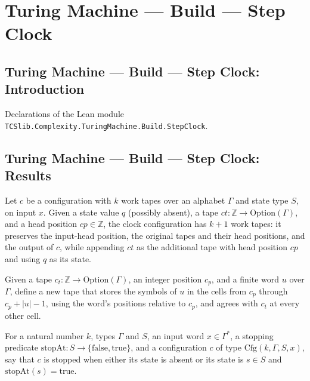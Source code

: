 \section{Turing Machine --- Build --- Step Clock}
\subsection*{Turing Machine --- Build --- Step Clock: Introduction}

Declarations of the Lean module \texttt{TCSlib.Complexity.TuringMachine.Build.StepClock}.

\subsection*{Turing Machine --- Build --- Step Clock: Results}

\begin{definition}
\label{Turing.clockCfg}
\leanok
{}
Let $c$ be a configuration with $k$ work tapes over an alphabet $\Gamma$ and state type
$S$, on input $x$. Given a state value $q$ (possibly absent), a tape
$ct:\mathbb{Z}\to\mathrm{Option}(\Gamma)$, and a head position $cp\in\mathbb{Z}$, the
clock configuration has $k+1$ work tapes: it preserves the input-head position, the
original tapes and their head positions, and the output of $c$, while appending $ct$ as
the additional tape with head position $cp$ and using $q$ as its state.
\end{definition}

\begin{definition}
\label{Turing.wordPatch}
\leanok
{}
Given a tape $c_t\colon\mathbb{Z}\to\mathrm{Option}(\Gamma)$, an integer position $c_p$,
and a finite word $u$ over $\Gamma$, define a new tape that stores the symbols of $u$ in
the cells from $c_p$ through $c_p+|u|-1$, using the word’s positions relative to $c_p$,
and agrees with $c_t$ at every other cell.
\end{definition}

\begin{definition}
\label{Turing.Cfg.Stopped}
\leanok
{}
For a natural number $k$, types $\Gamma$ and $S$, an input word $x\in\Gamma^*$, a
stopping predicate $\mathrm{stopAt}:S\to\{\mathrm{false},\mathrm{true}\}$, and a
configuration $c$ of type $\mathrm{Cfg}(k,\Gamma,S,x)$, say that $c$ is stopped when
either its state is absent or its state is $s\in S$ and $\mathrm{stopAt}(s)=\mathrm{true}$.
\end{definition}

